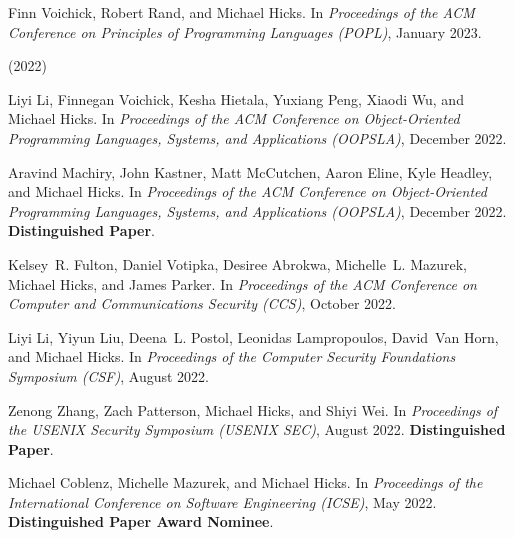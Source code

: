 \documentclass[11pt]{article}
\begin{document}
\begin{description}
\item
Finn Voichick, Robert Rand, and Michael Hicks.
 In {\em Proceedings of the {ACM} Conference on Principles of
  Programming Languages (POPL)}, January 2023.

  \item
  \item (2022)

\item
Liyi Li, Finnegan Voichick, Kesha Hietala, Yuxiang Peng, Xiaodi Wu, and Michael
  Hicks.
 In {\em Proceedings of the {ACM} Conference on Object-Oriented
  Programming Languages, Systems, and Applications (OOPSLA)}, December 2022.

\item
Aravind Machiry, John Kastner, Matt McCutchen, Aaron Eline, Kyle Headley, and
  Michael Hicks.
 In {\em Proceedings of the {ACM} Conference on Object-Oriented
  Programming Languages, Systems, and Applications (OOPSLA)}, December 2022.
 \textbf{Distinguished Paper}.
   
\item
Kelsey~R. Fulton, Daniel Votipka, Desiree Abrokwa, Michelle~L. Mazurek, Michael
  Hicks, and James Parker.
 In {\em Proceedings of the {ACM} Conference on Computer and
  Communications Security (CCS)}, October 2022.

\item
Liyi Li, Yiyun Liu, Deena~L. Postol, Leonidas Lampropoulos, David~Van Horn, and
  Michael Hicks.
 In {\em Proceedings of the Computer Security Foundations Symposium
  (CSF)}, August 2022.

\item
Zenong Zhang, Zach Patterson, Michael Hicks, and Shiyi Wei.
 In {\em Proceedings of the USENIX Security Symposium (USENIX SEC)},
  August 2022.
 \textbf{Distinguished Paper}.

\item
Michael Coblenz, Michelle Mazurek, and Michael Hicks.
 In {\em Proceedings of the International Conference on Software
  Engineering (ICSE)}, May 2022.
\textbf{Distinguished Paper Award Nominee}.


\end{description}
\end{document}
